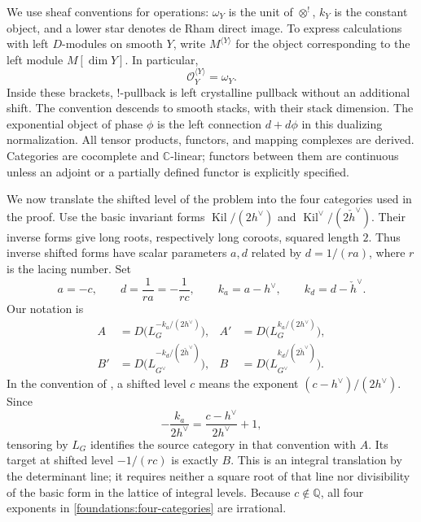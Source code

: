 \documentclass[11pt]{article}
\numberwithin{equation}{section}
\theoremstyle{definition}
\theoremstyle{remark}
\begin{document}
We use sheaf conventions for operations: $\omega_Y$ is the unit of
$\otimes^!$, $k_Y$ is the constant object, and a lower star denotes de Rham
direct image.  To express calculations with left $D$-modules on smooth
$Y$, write $M^{\langle Y\rangle}$ for the object corresponding to the left
module $M[\dim Y]$.  In particular,
\[
 \mathcal O_Y^{\langle Y\rangle}=\omega_Y.
\]
Inside these brackets, $!$-pullback is left crystalline pullback without
an additional shift.  The convention descends to smooth stacks, with their
stack dimension.  The exponential object of phase $\phi$ is the left
connection $d+d\phi$ in this dualizing normalization.  All tensor products,
functors, and mapping complexes are derived.  Categories are cocomplete
and $\mathbb C$-linear; functors between them are continuous unless an
adjoint or a partially defined functor is explicitly specified.

We now translate the shifted level of the problem into the four categories
used in the proof.  Use the basic invariant forms
$\operatorname{Kil}/(2h^\vee)$ and
$\operatorname{Kil}^{\vee}/(2\check h^\vee)$.  Their inverse forms give
long roots, respectively long coroots, squared length $2$.  Thus inverse
shifted forms have scalar parameters $a,d$ related by $d=1/(ra)$, where
$r$ is the lacing number.  Set
\begin{equation}\label{foundations:levels}
 a=-c,\qquad d=\frac1{ra}=-\frac1{rc},\qquad
 k_a=a-h^\vee,\qquad k_d=d-\check h^\vee.
\end{equation}
Our notation is
\begin{equation}\label{foundations:four-categories}
 \begin{aligned}
 A&=D\bigl(L_G^{-k_a/(2h^\vee)}\bigr),&
 A'&=D\bigl(L_G^{k_a/(2h^\vee)}\bigr),\\
 B'&=D\bigl(L_{G^\vee}^{-k_d/(2\check h^\vee)}\bigr),&
 B&=D\bigl(L_{G^\vee}^{k_d/(2\check h^\vee)}\bigr).
 \end{aligned}
\end{equation}
In the convention of \cite[Section~1.1.5]{BogdanovaBetti}, a shifted level
$c$ means the exponent $(c-h^\vee)/(2h^\vee)$.  Since
\[
 -\frac{k_a}{2h^\vee}
 =\frac{c-h^\vee}{2h^\vee}+1,
\]
tensoring by $L_G$ identifies the source category in that convention with
$A$.  Its target at shifted level $-1/(rc)$ is exactly $B$.
This is an integral translation by the determinant line; it requires
neither a square root of that line nor divisibility of the basic form in
the lattice of integral levels.  Because $c\notin\mathbb Q$, all four
exponents in \eqref{foundations:four-categories} are irrational.
\end{document}
